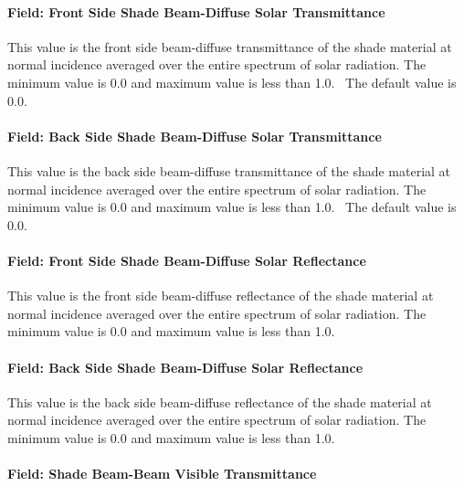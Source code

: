 \paragraph{Field: Front Side Shade Beam-Diffuse Solar Transmittance}\label{field-front-side-shade-beam-diffuse-solar-transmittance}

This value is the front side beam-diffuse transmittance of the shade material at normal incidence averaged over the entire spectrum of solar radiation. The minimum value is 0.0 and maximum value is less than 1.0.~ The default value is 0.0.

\paragraph{Field: Back Side Shade Beam-Diffuse Solar Transmittance}\label{field-back-side-shade-beam-diffuse-solar-transmittance}

This value is the back side beam-diffuse transmittance of the shade material at normal incidence averaged over the entire spectrum of solar radiation. The minimum value is 0.0 and maximum value is less than 1.0.~ The default value is 0.0.

\paragraph{Field: Front Side Shade Beam-Diffuse Solar Reflectance}\label{field-front-side-shade-beam-diffuse-solar-reflectance}

This value is the front side beam-diffuse reflectance of the shade material at normal incidence averaged over the entire spectrum of solar radiation. The minimum value is 0.0 and maximum value is less than 1.0.

\paragraph{Field: Back Side Shade Beam-Diffuse Solar Reflectance}\label{field-back-side-shade-beam-diffuse-solar-reflectance}

This value is the back side beam-diffuse reflectance of the shade material at normal incidence averaged over the entire spectrum of solar radiation. The minimum value is 0.0 and maximum value is less than 1.0.

\paragraph{Field: Shade Beam-Beam Visible Transmittance}\label{field-shade-beam-beam-visible-transmittance}

